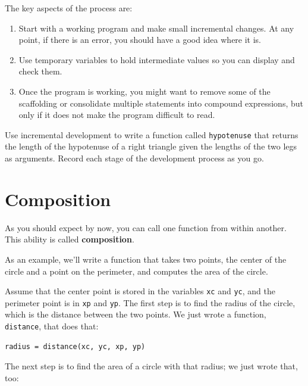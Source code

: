 The key aspects of the process are:

\begin{enumerate}

\item Start with a working program and make small incremental changes. 
At any point, if there is an error, you should have a good idea
where it is.

\item Use temporary variables to hold intermediate values so you can
display and check them.

\item Once the program is working, you might want to remove some of
the scaffolding or consolidate multiple statements into compound
expressions, but only if it does not make the program difficult to
read.

\end{enumerate}

\begin{ex}


Use incremental development to write a function
called {\tt hypotenuse} that returns the length of the hypotenuse of a
right triangle given the lengths of the two legs as arguments.
Record each stage of the development process as you go.
\end{ex}


\section{Composition}


As you should expect by now, you can call one function from
within another.  This ability is called {\bf composition}.

As an example, we'll write a function that takes two points,
the center of the circle and a point on the perimeter, and computes
the area of the circle.

Assume that the center point is stored in the variables {\tt xc} and
{\tt yc}, and the perimeter point is in {\tt xp} and {\tt yp}. The
first step is to find the radius of the circle, which is the distance
between the two points.  We just wrote a function, {\tt
distance}, that does that:

\beforeverb
\begin{verbatim}
radius = distance(xc, yc, xp, yp)
\end{verbatim}
\afterverb
%
The next step is to find the area of a circle with that radius;
we just wrote that, too:

